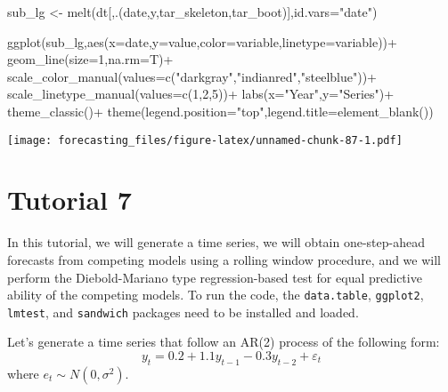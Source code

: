 \documentclass[
  oneside]{book}
\newenvironment{Shaded}{\begin{snugshade}}{\end{snugshade}}
\newcommand{\AttributeTok}[1]{\textcolor[rgb]{0.77,0.63,0.00}{#1}}
\newcommand{\DecValTok}[1]{\textcolor[rgb]{0.00,0.00,0.81}{#1}}
\newcommand{\FunctionTok}[1]{\textcolor[rgb]{0.00,0.00,0.00}{#1}}
\newcommand{\NormalTok}[1]{#1}
\newcommand{\OtherTok}[1]{\textcolor[rgb]{0.56,0.35,0.01}{#1}}
\newcommand{\SpecialCharTok}[1]{\textcolor[rgb]{0.00,0.00,0.00}{#1}}
\newcommand{\StringTok}[1]{\textcolor[rgb]{0.31,0.60,0.02}{#1}}
\begin{document}
\begin{Shaded}
\begin{Highlighting}[]
\NormalTok{sub\_lg }\OtherTok{\textless{}{-}} \FunctionTok{melt}\NormalTok{(dt[,.(date,y,tar\_skeleton,tar\_boot)],}\AttributeTok{id.vars=}\StringTok{"date"}\NormalTok{)}

\FunctionTok{ggplot}\NormalTok{(sub\_lg,}\FunctionTok{aes}\NormalTok{(}\AttributeTok{x=}\NormalTok{date,}\AttributeTok{y=}\NormalTok{value,}\AttributeTok{color=}\NormalTok{variable,}\AttributeTok{linetype=}\NormalTok{variable))}\SpecialCharTok{+}
  \FunctionTok{geom\_line}\NormalTok{(}\AttributeTok{size=}\DecValTok{1}\NormalTok{,}\AttributeTok{na.rm=}\NormalTok{T)}\SpecialCharTok{+}
  \FunctionTok{scale\_color\_manual}\NormalTok{(}\AttributeTok{values=}\FunctionTok{c}\NormalTok{(}\StringTok{"darkgray"}\NormalTok{,}\StringTok{"indianred"}\NormalTok{,}\StringTok{"steelblue"}\NormalTok{))}\SpecialCharTok{+}
  \FunctionTok{scale\_linetype\_manual}\NormalTok{(}\AttributeTok{values=}\FunctionTok{c}\NormalTok{(}\DecValTok{1}\NormalTok{,}\DecValTok{2}\NormalTok{,}\DecValTok{5}\NormalTok{))}\SpecialCharTok{+}
  \FunctionTok{labs}\NormalTok{(}\AttributeTok{x=}\StringTok{"Year"}\NormalTok{,}\AttributeTok{y=}\StringTok{"Series"}\NormalTok{)}\SpecialCharTok{+}
  \FunctionTok{theme\_classic}\NormalTok{()}\SpecialCharTok{+}
  \FunctionTok{theme}\NormalTok{(}\AttributeTok{legend.position=}\StringTok{"top"}\NormalTok{,}\AttributeTok{legend.title=}\FunctionTok{element\_blank}\NormalTok{())}
\end{Highlighting}
\end{Shaded}

\texttt{[image: forecasting\_files/figure-latex/unnamed-chunk-87-1.pdf]}

\hypertarget{tutorial-7}{%
\chapter*{Tutorial 7}\label{tutorial-7}}

In this tutorial, we will generate a time series, we will obtain one-step-ahead forecasts from competing models using a rolling window procedure, and we will perform the Diebold-Mariano type regression-based test for equal predictive ability of the competing models. To run the code, the \texttt{data.table}, \texttt{ggplot2}, \texttt{lmtest}, and \texttt{sandwich} packages need to be installed and loaded.

Let's generate a time series that follow an AR(2) process of the following form:
\[y_t = 0.2+1.1y_{t-1}-0.3y_{t-2}+\varepsilon_t\]
where \(e_{t} \sim N(0,\sigma^2)\).
\end{document}
